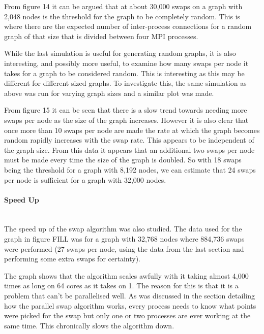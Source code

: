 \documentclass[pdftex,12pt,a4paper]{article}
\begin{document}
From figure 14 it can be argued that at about 30,000 swaps on a graph with 2,048 nodes is the threshold for the graph to be completely random. This is where there are the expected number of inter-process connections for a random graph of that size that is divided between four MPI processes.

While the last simulation is useful for generating random graphs, it is also interesting, and possibly more useful, to examine how many swaps per node it takes for a graph to be considered random. This is interesting as this may be different for different sized graphs. To investigate this, the same simulation as above was run for varying graph sizes and a similar plot was made.

From figure 15 it can be seen that there is a slow trend towards needing more swaps per node as the size of the graph increases. However it is also clear that once more than 10 swaps per node are made the rate at which the graph becomes random rapidly increases with the swap rate. This appears to be independent of the graph size. From this data it appears that an additional two swaps per node must be made every time the size of the graph is doubled. So with 18 swaps being the threshold for a graph with 8,192 nodes, we can estimate that 24 swaps per node is sufficient for a graph with 32,000 nodes.
\newpage
\paragraph{Speed Up}  ~\\

The speed up of the swap algorithm was also studied. The data used for the graph in figure FILL was for a graph with 32,768 nodes where 884,736 swaps were performed (27 swaps per node, using the data from the last section and performing some extra swaps for certainty).

The graph shows that the algorithm scales awfully with it taking almost 4,000 times as long on 64 cores as it takes on 1. The reason for this is that it is a problem that can't be parallelised well. As was discussed in the section detailing how the parallel swap algorithm works, every process needs to know what points were picked for the swap but only one or two processes are ever working at the same time. This chronically slows the algorithm down.
\end{document}
